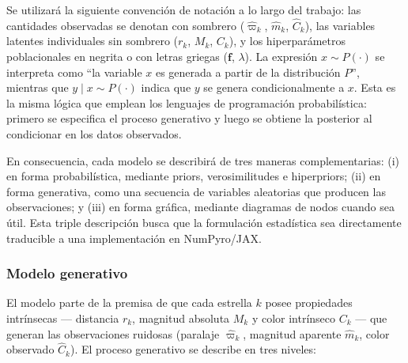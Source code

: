 \documentclass[stu, 12pt, letterpaper, donotrepeattitle, floatsintext, natbib]{apa7_ula}
\begin{document}
Se utilizará la siguiente convención de notación a lo largo del trabajo:
las cantidades observadas se denotan con sombrero
($\hat{\varpi}_k$, $\hat{m}_k$, $\hat{C}_k$), las variables latentes
individuales sin sombrero ($r_k$, $M_k$, $C_k$), y los hiperparámetros
poblacionales en negrita o con letras griegas
($\mathbf{f}$, $\lambda$). La expresión
$x \sim P(\cdot)$ se interpreta como ``la variable $x$ es generada a
partir de la distribución $P$'', mientras que
$y \mid x \sim P(\cdot)$ indica que $y$ se genera condicionalmente a
$x$. Esta es la misma lógica que emplean los lenguajes de programación
probabilística: primero se especifica el proceso generativo y luego se
obtiene la posterior al condicionar en los datos observados.

En consecuencia, cada modelo se describirá de tres maneras
complementarias: (i) en forma probabilística, mediante priors,
verosimilitudes e hiperpriors; (ii) en forma generativa, como una
secuencia de variables aleatorias que producen las observaciones; y
(iii) en forma gráfica, mediante diagramas de nodos cuando sea útil.
Esta triple descripción busca que la formulación estadística sea
directamente traducible a una implementación en NumPyro/JAX.

\subsubsection{Modelo generativo}
El modelo parte de la premisa de que cada estrella $k$ posee
propiedades intrínsecas --- distancia $r_k$, magnitud absoluta $M_k$
y color intrínseco $C_k$ --- que generan las observaciones ruidosas
(paralaje $\hat{\varpi}_k$, magnitud aparente $\hat{m}_k$, color
observado $\hat{C}_k$). El proceso generativo se describe en tres
niveles:
\end{document}
